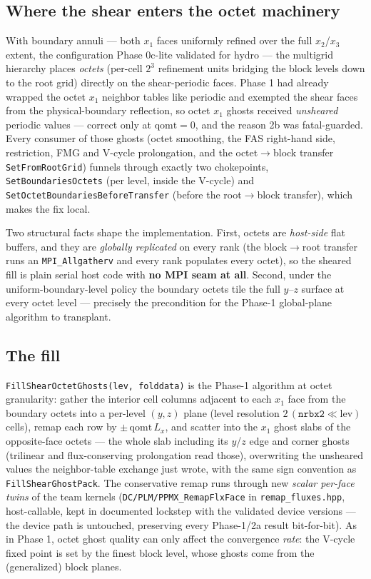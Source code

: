 \documentclass[11pt]{article}
\newcommand{\code}[1]{\texttt{#1}}
\begin{document}
\subsection{Where the shear enters the octet machinery}
With boundary annuli --- both $x_1$ faces uniformly refined over the full
$x_2$/$x_3$ extent, the configuration Phase 0c-lite validated for hydro --- the
multigrid hierarchy places \emph{octets} (per-cell $2^3$ refinement units bridging
the block levels down to the root grid) directly on the shear-periodic faces.
Phase 1 had already wrapped the octet $x_1$ neighbor tables like periodic and
exempted the shear faces from the physical-boundary reflection, so octet $x_1$
ghosts received \emph{unsheared} periodic values --- correct only at
$\mathrm{qomt}=0$, and the reason 2b was fatal-guarded. Every consumer of those
ghosts (octet smoothing, the FAS right-hand side, restriction, FMG and V-cycle
prolongation, and the octet$\to$block transfer \code{SetFromRootGrid}) funnels
through exactly two chokepoints, \code{SetBoundariesOctets} (per level, inside the
V-cycle) and \code{SetOctetBoundariesBeforeTransfer} (before the root$\to$block
transfer), which makes the fix local.

Two structural facts shape the implementation. First, octets are \emph{host-side}
flat buffers, and they are \emph{globally replicated} on every rank (the
block$\to$root transfer runs an \code{MPI\_Allgatherv} and every rank populates
every octet), so the sheared fill is plain serial host code with \textbf{no MPI
seam at all}. Second, under the uniform-boundary-level policy the boundary octets
tile the full $y$--$z$ surface at every octet level --- precisely the precondition
for the Phase-1 global-plane algorithm to transplant.

\subsection{The fill}
\code{FillShearOctetGhosts(lev, folddata)} is the Phase-1 algorithm at octet
granularity: gather the interior cell columns adjacent to each $x_1$ face from the
boundary octets into a per-level $(y,z)$ plane (level resolution
$2\,(\code{nrbx2} \ll \mathrm{lev})$ cells), remap each row by
$\pm\,\mathrm{qomt}\,L_x$, and scatter into the $x_1$ ghost slabs of the
opposite-face octets --- the whole slab including its $y$/$z$ edge and corner
ghosts (trilinear and flux-conserving prolongation read those), overwriting the
unsheared values the neighbor-table exchange just wrote, with the same sign
convention as \code{FillShearGhostPack}. The conservative remap runs through new
\emph{scalar per-face twins} of the team kernels
(\code{DC/PLM/PPMX\_RemapFlxFace} in \code{remap\_fluxes.hpp}, host-callable,
kept in documented lockstep with the validated device versions --- the device path
is untouched, preserving every Phase-1/2a result bit-for-bit). As in Phase 1,
octet ghost quality can only affect the convergence \emph{rate}: the V-cycle fixed
point is set by the finest block level, whose ghosts come from the (generalized)
block planes.
\end{document}
